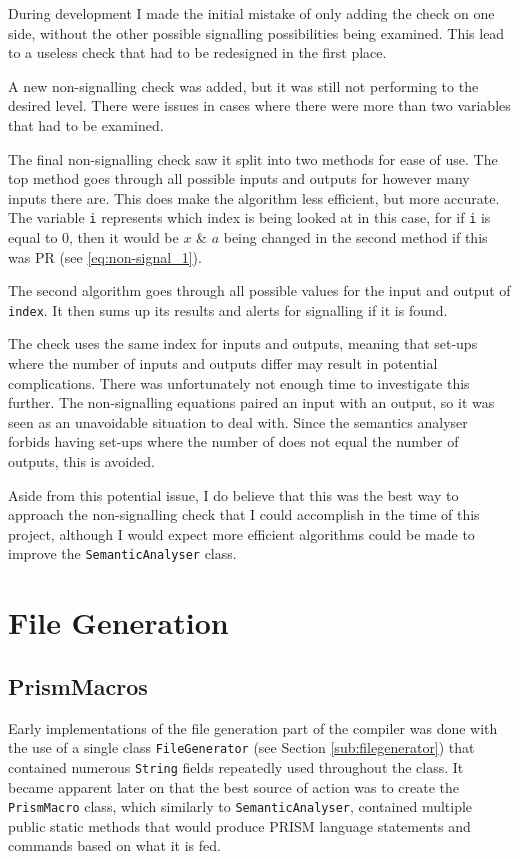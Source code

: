 \documentclass[report.tex]{subfiles}
\begin{document}
During development I made the initial mistake of only adding the check on one
side, without the other possible signalling possibilities being examined. This
lead to a useless check that had to be redesigned in the first place.

A new non-signalling check was added, but it was still not performing to the
desired level. There were issues in cases where there were more than two
variables that had to be examined.



The final non-signalling check saw it split into two methods for ease of use.
The top method goes through all possible inputs and outputs for however many
inputs there are. This does make the algorithm less efficient, but more
accurate. The variable \texttt{i} represents which index is being looked at
in this case, for if \texttt{i} is equal to 0, then it would be \(x\) \& \(a\)
being changed in the second method if this was PR (see \ref{eq:non-signal_1}).

The second algorithm goes through all possible values for the input and output
of \texttt{index}. It then sums up its results and alerts for signalling if 
it is found.

The check uses the same index for inputs and outputs, meaning that set-ups
where the number of inputs and outputs differ may result in potential
complications. There was unfortunately not enough time to investigate this
further. The non-signalling equations paired an input with an output, so it was
seen as an unavoidable situation to deal with. Since the semantics analyser
forbids having set-ups where the number of does not equal the number of outputs,
this is avoided.

Aside from this potential issue, I do believe that this was the best way to
approach the non-signalling check that I could accomplish in the time of this
project, although I would expect more efficient algorithms could be made to
improve the \texttt{SemanticAnalyser} class.

\section{File Generation} %
\label{sec:file_generation}
\subsection{PrismMacros} %
\label{sub:prismmacros}
Early implementations of the file generation part of the compiler was done with
the use of a single class \texttt{FileGenerator} (see Section
\ref{sub:filegenerator}) that contained numerous \texttt{String} fields
repeatedly used throughout the class. It became apparent later on that the best
source of action was to create the \texttt{PrismMacro} class, which similarly to
\texttt{SemanticAnalyser}, contained multiple public static methods that would
produce PRISM language statements and commands based on what it is fed.
\end{document}
